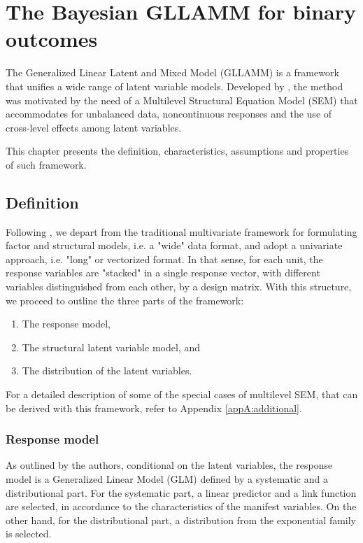 \chapter{The Bayesian GLLAMM for binary outcomes} \label{chap:framework}

The Generalized Linear Latent and Mixed Model (GLLAMM) is a framework that unifies a wide range of latent variable models. Developed by \citet{Rabe_et_al_2004a, Rabe_et_al_2004b, Rabe_et_al_2004c, Skrondal_et_al_2004a, Rabe_et_al_2012}, the method was motivated by the need of a Multilevel Structural Equation Model (SEM) that accommodates for unbalanced data, noncontinuous responses and the use of cross-level effects among latent variables. 

This chapter presents the definition, characteristics, assumptions and properties of such framework.


\section{Definition} \label{sect:definition}
Following \citet{Rabe_et_al_2004a, Rabe_et_al_2012}, we depart from the traditional multivariate framework for formulating factor and structural models, i.e. a "wide" data format, and adopt a univariate approach, i.e. "long" or vectorized format. In that sense, for each unit, the response variables are "stacked" in a single response vector, with different variables distinguished from each other, by a design matrix. With this structure, we proceed to outline the three parts of the framework: 
\begin{enumerate}
	\item The response model, 
	\item The structural latent variable model, and 
	\item The distribution of the latent variables. 
\end{enumerate}
For a detailed description of some of the special cases of multilevel SEM, that can be derived with this framework, refer to Appendix \ref{appA:additional}.


\subsection{Response model} \label{s_sect:response}
As outlined by the authors, conditional on the latent variables, the response model is a Generalized Linear Model (GLM) defined by a systematic and a distributional part. For the systematic part, a linear predictor and a link function are selected, in accordance to the characteristics of the manifest variables. On the other hand, for the distributional part, a distribution from the exponential family is selected.

